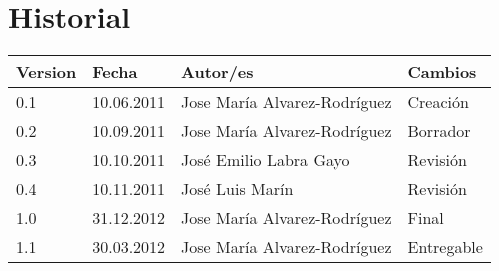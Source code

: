 \chapter*{Historial}
\thispagestyle{empty}

\begin{tabular}{|p{1.3cm}|p{2cm}|p{7cm}|p{3cm}|}  \hline
Version & Fecha & Autor/es & Cambios \\ \hline \hline

0.1 & 10.06.2011 & Jose María Alvarez-Rodríguez & Creación  \\
0.2 & 10.09.2011 & Jose María Alvarez-Rodríguez& Borrador \\
0.3 & 10.10.2011 & José Emilio Labra Gayo & Revisión \\
0.4 & 10.11.2011 & José Luis Marín & Revisión \\
1.0 & 31.12.2012 & Jose María Alvarez-Rodríguez & Final \\
1.1 & 30.03.2012 & Jose María Alvarez-Rodríguez & Entregable \\
\hline
\end{tabular}
